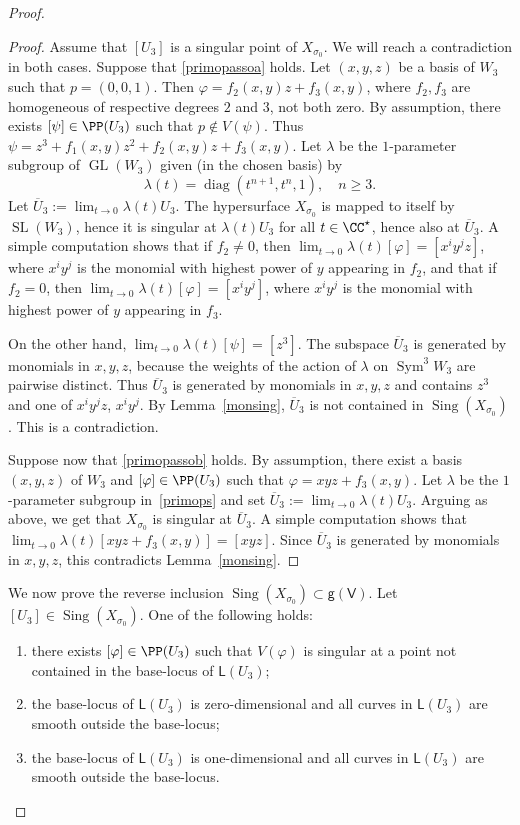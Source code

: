 \documentclass[JEP,XML,SOM,Unicode, NoEqCountersInSection,NoFloatCountersInSection]{cedram}
\newenvironment{enumeratea}
{\bgroup\def\theenumi{\alph{enumi}}\def\theenumii{\arabic{enumii}}\begin{enumerate}}
{\end{enumerate}\egroup}
\theoremstyle{definition}
\newcommand\sfg{\mathsf{g}}
\newcommand\sfL{\mathsf{L}}
\newcommand\sfV{\mathsf{V}}
\newcommand\gv{\sfg(\sfV)}
\let\phi\varphi
\let\ov\overline
\DeclareMathOperator{\GL}{GL}
\DeclareMathOperator{\Sing}{Sing}\let\sing\Sing
\DeclareMathOperator{\Sym}{Sym}
\DeclareMathOperator{\SL}{SL}
\DeclareMathOperator{\diag}{diag}
\begin{document}
\begin{proof}
\begin{proof}
Assume that $[U_3]$ is a singular point of $X_{\sigma_0}$. We will reach a contradiction in both cases.
Suppose that \eqref{primopassoa} holds. Let $(x,y,z)$ be a basis of $W_3$ such that $p=(0,0,1)$. Then
$\phi=f_2(x,y)z+f_3(x,y)$, where $f_2,f_3$ are homogeneous of respective degrees $2$ and $3$, not both zero. By assumption, there exists $[\psi]\in\PP(U_3)$ such that $p\notin V(\psi)$. Thus $\psi=z^3+f_1(x,y)z^2+f_2(x,y)z+f_3(x,y)$. Let $\lambda$ be the $1$-parameter subgroup of $\GL(W_3)$ given (in the chosen basis) by
\begin{equation}\label{primops}
\lambda(t)=\diag(t^{n+1},t^{n},1),\quad n\ge 3.
\end{equation}
Let $\ov{U}_3 :=\lim_{t\to 0}\lambda(t)U_3$. The hypersurface $X_{\sigma_0}$ is mapped to itself by $\SL(W_3)$, hence it is singular at $\lambda(t)U_3$ for all $t\in\CC^\star$,
hence also at $\ov{U}_3$. A simple computation shows that if $f_2\ne 0$, then
$\lim_{t\to 0}\lambda(t)[\phi]=[x^i y^jz]$, where $x^i y^j$ is the monomial with highest power of $y$ appearing in $f_2$, and that if $f_2=0$, then $\lim_{t\to 0}\lambda(t)[\phi]=[x^i y^j]$, where $x^i y^j$ is the monomial with highest power of $y$ appearing in $f_3$.

On the other hand, $\lim_{t\to 0}\lambda(t)[\psi]=[z^3]$. The subspace $\ov{U}_3$ is generated by monomials in $x,y,z$, because the weights of the action of $\lambda$ on $\Sym^3\! W_3$ are pairwise distinct. Thus $\ov{U}_3$ is generated by monomials in $x,y,z$ and contains $z^3$ and one of $x^i y^jz$, $x^i y^j$. By Lemma~\ref{monsing}, $\ov{U}_3$ is not contained in $\sing (X_{\sigma_0})$. This is a contradiction.

Suppose now that \eqref{primopassob} holds. By assumption, there exist a basis $(x,y,z)$ of $W_3$ and $[\phi]\in\PP(U_3)$ such that $\phi=xyz+f_3(x,y)$. Let $\lambda$ be the $1$-parameter subgroup in~\eqref{primops} and
set $\ov{U}_3 :=\lim_{t\to 0}\lambda(t)U_3$. Arguing as above, we get that $X_{\sigma_0}$ is singular at $\ov{U}_3$. A simple computation shows that $\lim_{t\to 0}\lambda(t)[xyz+f_3(x,y)]=[xyz]$. Since $\ov{U}_3$ is generated by monomials in $x,y,z$, this contradicts Lemma~\ref{monsing}.
\end{proof}

We now prove the reverse inclusion $\Sing( X_{\sigma_0})\subset \gv$.
Let $[U_3]\in \Sing( X_{\sigma_0})$. One of the following holds:
\begin{enumeratea}
\item\label{enum:a}
there exists $[\phi]\in \PP(U_3)$ such that $V(\phi)$ is singular at a point not contained in the base-locus of $\sfL(U_3)$;
\item\label{enum:b}
the base-locus of $\sfL(U_3)$ is zero-dimensional and all curves in $\sfL(U_3)$ are smooth outside the base-locus;
\item\label{enum:c}
the base-locus of $\sfL(U_3)$ is one-dimensional and all curves in $\sfL(U_3)$ are smooth outside the base-locus.
\end{enumeratea}


\end{proof}
\end{document}
